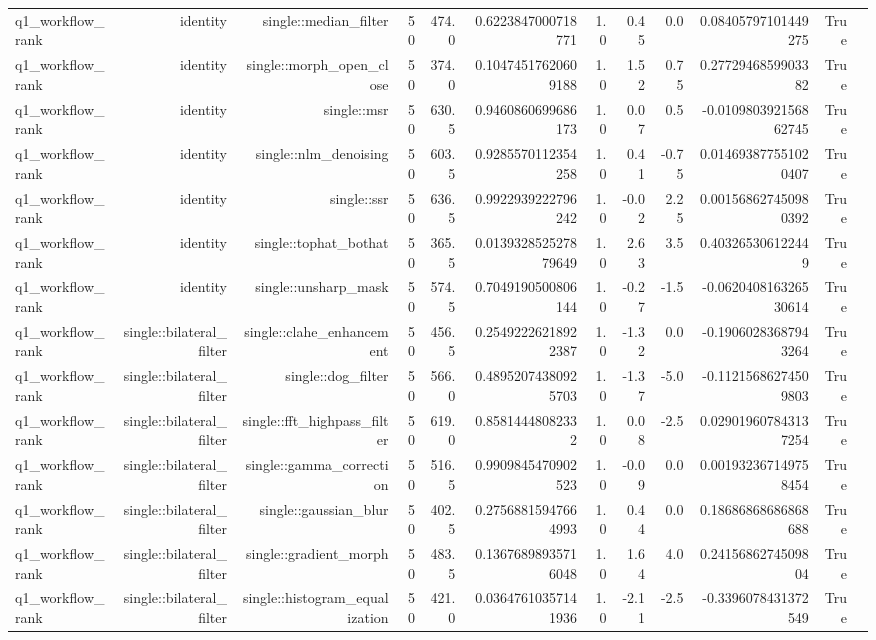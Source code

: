 \begin{tabular}{lrrrrrrrrrrr}
q1\_workflow\_rank & identity & single::median\_filter & 50 & 474.0 & 0.6223847000718771 & 1.0 & 0.45 & 0.0 & 0.08405797101449275 & True &  \\
q1\_workflow\_rank & identity & single::morph\_open\_close & 50 & 374.0 & 0.10474517620609188 & 1.0 & 1.52 & 0.75 & 0.2772946859903382 & True &  \\
q1\_workflow\_rank & identity & single::msr & 50 & 630.5 & 0.9460860699686173 & 1.0 & 0.07 & 0.5 & -0.010980392156862745 & True &  \\
q1\_workflow\_rank & identity & single::nlm\_denoising & 50 & 603.5 & 0.9285570112354258 & 1.0 & 0.41 & -0.75 & 0.014693877551020407 & True &  \\
q1\_workflow\_rank & identity & single::ssr & 50 & 636.5 & 0.9922939222796242 & 1.0 & -0.02 & 2.25 & 0.001568627450980392 & True &  \\
q1\_workflow\_rank & identity & single::tophat\_bothat & 50 & 365.5 & 0.013932852527879649 & 1.0 & 2.63 & 3.5 & 0.403265306122449 & True &  \\
q1\_workflow\_rank & identity & single::unsharp\_mask & 50 & 574.5 & 0.7049190500806144 & 1.0 & -0.27 & -1.5 & -0.062040816326530614 & True &  \\
q1\_workflow\_rank & single::bilateral\_filter & single::clahe\_enhancement & 50 & 456.5 & 0.25492226218922387 & 1.0 & -1.32 & 0.0 & -0.19060283687943264 & True &  \\
q1\_workflow\_rank & single::bilateral\_filter & single::dog\_filter & 50 & 566.0 & 0.48952074380925703 & 1.0 & -1.37 & -5.0 & -0.11215686274509803 & True &  \\
q1\_workflow\_rank & single::bilateral\_filter & single::fft\_highpass\_filter & 50 & 619.0 & 0.85814448082332 & 1.0 & 0.08 & -2.5 & 0.029019607843137254 & True &  \\
q1\_workflow\_rank & single::bilateral\_filter & single::gamma\_correction & 50 & 516.5 & 0.9909845470902523 & 1.0 & -0.09 & 0.0 & 0.001932367149758454 & True &  \\
q1\_workflow\_rank & single::bilateral\_filter & single::gaussian\_blur & 50 & 402.5 & 0.27568815947664993 & 1.0 & 0.44 & 0.0 & 0.18686868686868688 & True &  \\
q1\_workflow\_rank & single::bilateral\_filter & single::gradient\_morph & 50 & 483.5 & 0.13676898935716048 & 1.0 & 1.64 & 4.0 & 0.2415686274509804 & True &  \\
q1\_workflow\_rank & single::bilateral\_filter & single::histogram\_equalization & 50 & 421.0 & 0.03647610357141936 & 1.0 & -2.11 & -2.5 & -0.3396078431372549 & True &  \\

\end{tabular}
